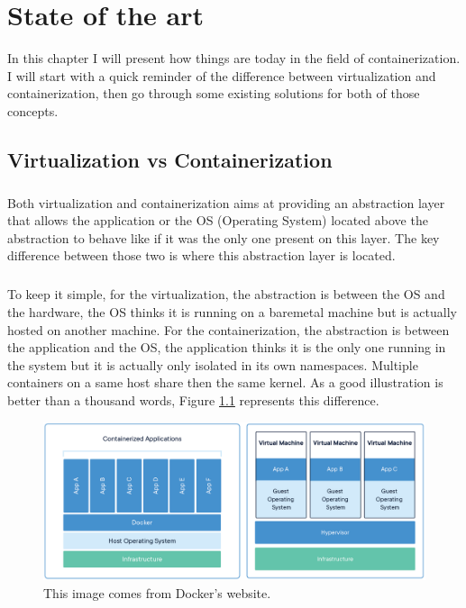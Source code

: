 \chapter{State of the art}

In this chapter I will present how things are today in the field of containerization.  I will start with a quick reminder of the difference between virtualization and containerization, then go through some existing solutions for both of those concepts.

\section{Virtualization vs Containerization}
\paragraph{}Both virtualization and containerization aims at providing an abstraction layer that allows the application or the OS (Operating System) located above the abstraction to behave like if it was the only one present on this layer.  The key difference between those two is where this abstraction layer is located.  

\paragraph{}To keep it simple, for the virtualization, the abstraction is between the OS and the hardware, the OS thinks it is running on a baremetal machine but is actually hosted on another machine.  For the containerization, the abstraction is between the application and the OS, the application thinks it is the only one running in the system but it is actually only isolated in its own namespaces.  Multiple containers on a same host share then the same kernel.  As a good illustration is better than a thousand words, Figure \ref{fig:virt-vs-cont} represents this difference. 
\begin{figure}[!h]
  \begin{center}
    \includegraphics[width=\linewidth]{images/Virtualization-Containerization.png}
    \caption{This image comes from Docker's website\cite{docker}.}
    \label{fig:virt-vs-cont}
  \end{center}
\end{figure}

